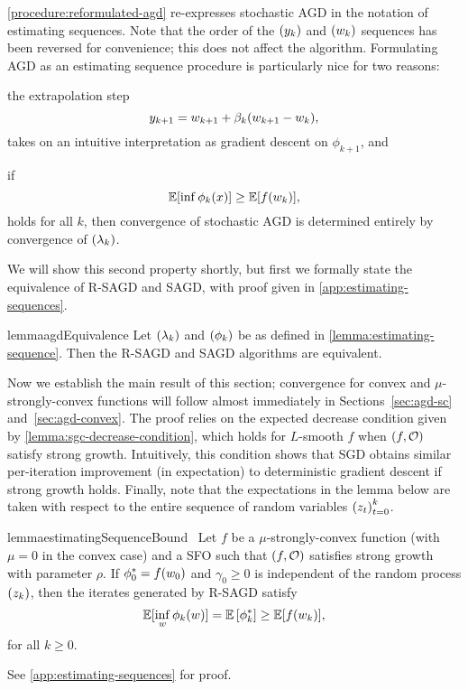 \autoref{procedure:reformulated-agd} re-expresses stochastic AGD in the notation of estimating sequences. 
Note that the order of the \( \seq{\yk} \) and \( \seq{\wk} \) sequences has been reversed for convenience; this does not affect the algorithm.
Formulating AGD as an estimating sequence procedure is particularly nice for two reasons:
\begin{inparaenum}[(1)]
\item the extrapolation step \[ \ykk = \wkk + \beta_k (\wkk - \wk), \] takes on an intuitive interpretation as gradient descent on \( \phi_{k+1} \), and 
\item if \[  \E [\inf \phi_k(x)] \geq \E [f(\wk)], \] holds for all \( k \), then convergence of stochastic AGD is determined entirely by convergence of \( \seq{\lambda_k} \).
\end{inparaenum}
We will show this second property shortly, but first we formally state the equivalence of R-SAGD and SAGD, with proof given in \autoref{app:estimating-sequences}.

\begin{restatable}{lemma}{agdEquivalence}\label{lemma:agdEquivalence}
    Let \( \seq{\lambda_k} \) and \( \seq{\phi_k} \) be as defined in \autoref{lemma:estimating-sequence}.
    Then the R-SAGD and SAGD algorithms are equivalent.
\end{restatable}

Now we establish the main result of this section; convergence for convex and \( \mu \)-strongly-convex functions will follow almost immediately in Sections~\ref{sec:agd-sc} and~\ref{sec:agd-convex}.
The proof relies on the expected decrease condition given by \autoref{lemma:sgc-decrease-condition}, which holds for \( L \)-smooth \( f \) when \( \rbr{f, \oracle{}} \) satisfy strong growth.
Intuitively, this condition shows that SGD obtains similar per-iteration improvement (in expectation) to deterministic gradient descent if strong growth holds. 
Finally, note that the expectations in the lemma below are taken with respect to the entire sequence of random variables \( \seq{\z_t}_{t=0}^k \).

\begin{restatable}{lemma}{estimatingSequenceBound}~\label{lemma:estimating-sequence-bound}
    Let \( f \) be a \( \mu \)-strongly-convex function (with \( \mu = 0 \) in the convex case) and \oracle{} a SFO such that \( \rbr{f, \oracle{}} \) satisfies strong growth with parameter \( \rho \).
    If \( \phi_0^* = f(\w_0) \) and \( \gamma_0 \geq 0 \) is independent of the random process \( \seq{\zk} \), then the iterates generated by R-SAGD satisfy 
    \[ \E [\inf_{w} \phi_k(\w)] = \E \sbr{\phi_k^*} \geq \E [f(\wk)], \]
    for all \( k \geq 0 \).
\end{restatable}
\noindent See \autoref{app:estimating-sequences} for proof.

